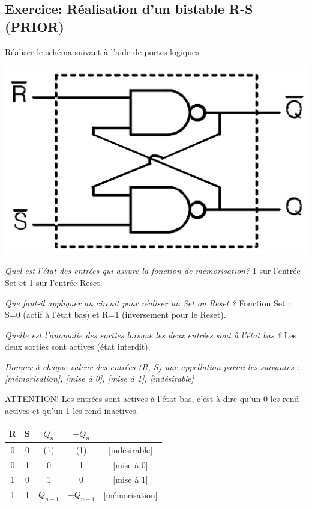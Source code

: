 \subsection{Exercice: Réalisation d'un bistable R-S (PRIOR)}
Réaliser le schéma suivant à l'aide de portes logiques.
\begin{center}
\includegraphics[scale=0.2]{Labo3_RS.png}
\end{center}

{
\textit{Quel est l'état des entrées qui assure la fonction de mémorisation?}
}
{%
1 sur l’entrée Set et 1 sur l’entrée Reset.
}

{
\textit{Que faut-il appliquer au circuit pour réaliser un Set ou Reset ?}
}
{%
Fonction Set : S=0 (actif à l’état bas) et R=1 (inversement pour le Reset).
}

{
\textit{Quelle est l'anomalie des sorties lorsque les deux entrées sont à l'état bas ?}
}
{%
Les deux sorties sont actives (état interdit).
}

{
\textit{Donner à chaque valeur des entrées (R, S) une appellation parmi les suivantes :
[mémorisation], [mise à 0], [mise à 1], [indésirable]}
}
{%
ATTENTION! Les entrées sont actives à l’état bas, c’est-à-dire qu’un 0 les rend actives et qu’un 1 les rend inactives.
	\begin{center}
		\begin{tabular}{|c|c|c|c|c|}
			\hline
            R&S&$Q_{n}$&$-Q_{n}$&\\
            \hline
            \hline
			0&0&(1)&(1)&[indésirable]\\
			0&1&0&1&[mise à 0]\\
			1&0&1&0&[mise à 1]\\
			1&1&$Q_{n-1}$&$-Q_{n-1}$&[mémorisation]\\
			\hline
		\end{tabular}
	\end{center}
}

